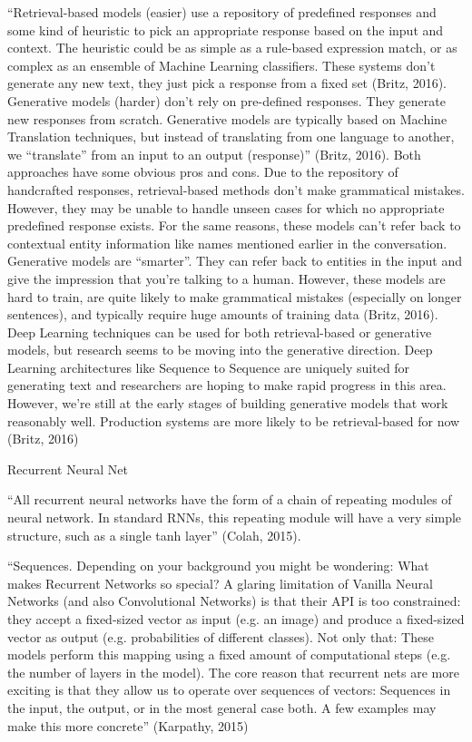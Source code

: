 \documentclass[12pt,english]{article}
\begin{document}
“Retrieval-based models (easier) use a repository of predefined responses and some kind of heuristic to pick an appropriate response based on the input and context. The heuristic could be as simple as a rule-based expression match, or as complex as an ensemble of Machine Learning classifiers. These systems don’t generate any new text, they just pick a response from a fixed set (Britz, 2016).
Generative models (harder) don’t rely on pre-defined responses. They generate new responses from scratch. Generative models are typically based on Machine Translation techniques, but instead of translating from one language to another, we “translate” from an input to an output (response)” (Britz, 2016). 
Both approaches have some obvious pros and cons. Due to the repository of handcrafted responses, retrieval-based methods don’t make grammatical mistakes. However, they may be unable to handle unseen cases for which no appropriate predefined response exists. For the same reasons, these models can’t refer back to contextual entity information like names mentioned earlier in the conversation. Generative models are “smarter”. They can refer back to entities in the input and give the impression that you’re talking to a human. However, these models are hard to train, are quite likely to make grammatical mistakes (especially on longer sentences), and typically require huge amounts of training data (Britz, 2016).
Deep Learning techniques can be used for both retrieval-based or generative models, but research seems to be moving into the generative direction. Deep Learning architectures like Sequence to Sequence are uniquely suited for generating text and researchers are hoping to make rapid progress in this area. However, we’re still at the early stages of building generative models that work reasonably well. Production systems are more likely to be retrieval-based for now (Britz, 2016)

Recurrent Neural Net 

“All recurrent neural networks have the form of a chain of repeating modules of neural network. In standard RNNs, this repeating module will have a very simple structure, such as a single tanh layer” (Colah, 2015).

“Sequences. Depending on your background you might be wondering: What makes Recurrent Networks so special? A glaring limitation of Vanilla Neural Networks (and also Convolutional Networks) is that their API is too constrained: they accept a fixed-sized vector as input (e.g. an image) and produce a fixed-sized vector as output (e.g. probabilities of different classes). Not only that: These models perform this mapping using a fixed amount of computational steps (e.g. the number of layers in the model). The core reason that recurrent nets are more exciting is that they allow us to operate over sequences of vectors: Sequences in the input, the output, or in the most general case both. A few examples may make this more concrete” (Karpathy, 2015)
\end{document}

